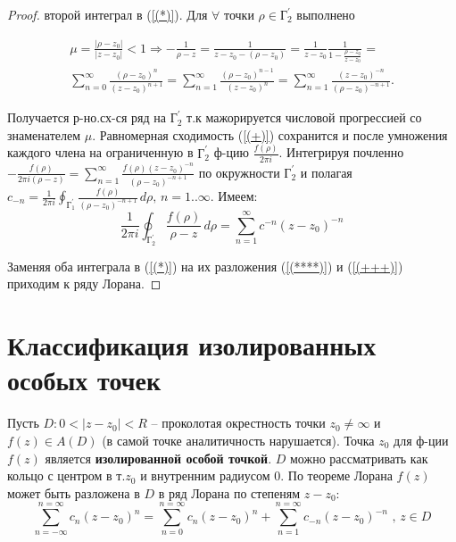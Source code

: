 \documentclass{article}
\begin{document}
\begin{proof}
\bigbreak
{} второй интеграл в (\ref{(*)}). Для $\forall$ точки $\rho \in  \text{Г}_2^{'}$ выполнено 

\begin{equation}
\begin{gathered}
    \mu=\frac{|\rho-z_0|}{|z-z_0|}<1 \Rightarrow -\frac{1}{\rho-z} = \frac{1}{z-z_0-(\rho-z_0)} = \frac{1}{z-z_0}\frac{1}{1-\frac{\rho-z_0}{z-z_0}}=
        \\
    \sum_{n=0}^{\infty}\frac{(\rho-z_0)^n}{(z-z_0)^{n+1}}=\sum_{n=1}^{\infty}\frac{(\rho-z_0)^{n-1}}{(z-z_0)^{n}}=
    \sum_{n=1}^{\infty}\frac{(z-z_0)^{-n} }{(\rho-z_0)^{-n+1}}.
\end{gathered}
    \label{(+)}
\end{equation}

Получается р-но.сх-ся ряд на $\text{Г}_2^{'}$ т.к мажорируется числовой прогрессией со знаменателем $\mu$. Равномерная сходимость (\ref{(+)}) сохранится и после умножения каждого члена на ограниченную в $\text{Г}_2^{'}$ ф-цию $\frac{f(\rho)}{2\pi i}$. Интегрируя почленно $-\frac{f(\rho)}{2\pi i(\rho-z)}=\sum_{n=1}^{\infty}\frac{f(\rho)(z-z_0)^{-n} }{(\rho-z_0)^{-n+1}}$ по окружности $\text{Г}_2^{'}$ и полагая $c_{-n} = \frac{1}{2\pi i} \oint_{ \text{Г}_1^{'}} \frac{f(\rho)}{(\rho-z_0)^{-n+1}} \,d\rho \text{, }n=1..\infty$. Имеем: 
\begin{equation}
    \frac{1}{2\pi i} \oint_{ \text{Г}_2^{'}} \frac{f(\rho)}{\rho-z} \,d\rho = \sum_{n=1}^{\infty} c^{-n}(z-z_0)^{-n}
    \label{(+++)}
\end{equation}


Заменяя оба интеграла в (\ref{(*)}) на их разложения (\ref{(****)}) и (\ref{(+++)}) приходим к ряду Лорана.
\end{proof}

\section{Классификация изолированных особых точек}
Пусть $D:0<|z-z_0|<R$ -- проколотая окрестность точки $z_0\neq\infty$ и $f(z) \in A(D)$ (в самой точке аналитичность нарушается). Точка $z_0$ для ф-ции $f(z)$ является \textbf{изолированной особой точкой}. $D$ можно рассматривать как кольцо с центром в т.$z_0$ и внутренним радиусом 0. По теореме Лорана $f(z)$ может быть разложена в $D$ в ряд Лорана по степеням $z-z_0$: 
$$\sum_{n=-\infty}^{n=\infty}c_n(z-z_0)^n=\sum_{n=0}^{n=\infty}c_n(z-z_0)^n +\sum_{n=1}^{n=\infty}c_{-n}(z-z_0)^{-n} \text{ , } z \in D$$
\end{document}
